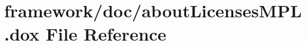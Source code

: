 \hypertarget{about_licenses_m_p_l_8dox}{}\section{framework/doc/about\+Licenses\+M\+PL.dox File Reference}
\label{about_licenses_m_p_l_8dox}
